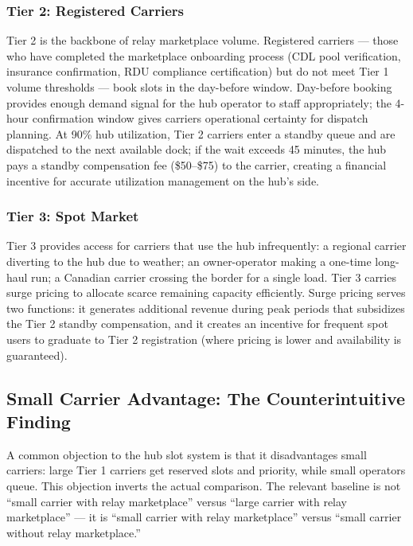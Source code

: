 \subsubsection*{Tier 2: Registered Carriers}

Tier 2 is the backbone of relay marketplace volume. Registered carriers --- those who have completed the marketplace onboarding process (CDL pool verification, insurance confirmation, RDU compliance certification) but do not meet Tier 1 volume thresholds --- book slots in the day-before window. Day-before booking provides enough demand signal for the hub operator to staff appropriately; the 4-hour confirmation window gives carriers operational certainty for dispatch planning. At 90\% hub utilization, Tier 2 carriers enter a standby queue and are dispatched to the next available dock; if the wait exceeds 45 minutes, the hub pays a standby compensation fee (\$50--\$75) to the carrier, creating a financial incentive for accurate utilization management on the hub's side.

\subsubsection*{Tier 3: Spot Market}

Tier 3 provides access for carriers that use the hub infrequently: a regional carrier diverting to the hub due to weather; an owner-operator making a one-time long-haul run; a Canadian carrier crossing the border for a single load. Tier 3 carries surge pricing to allocate scarce remaining capacity efficiently. Surge pricing serves two functions: it generates additional revenue during peak periods that subsidizes the Tier 2 standby compensation, and it creates an incentive for frequent spot users to graduate to Tier 2 registration (where pricing is lower and availability is guaranteed).

\subsection{Small Carrier Advantage: The Counterintuitive Finding}

A common objection to the hub slot system is that it disadvantages small carriers: large Tier 1 carriers get reserved slots and priority, while small operators queue. This objection inverts the actual comparison. The relevant baseline is not ``small carrier with relay marketplace'' versus ``large carrier with relay marketplace'' --- it is ``small carrier with relay marketplace'' versus ``small carrier without relay marketplace.''

